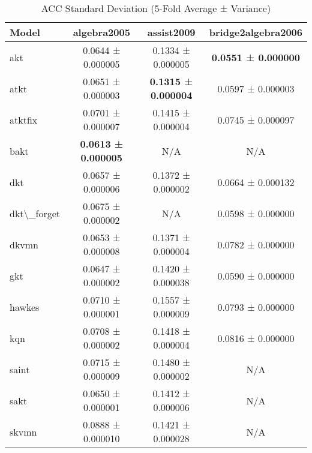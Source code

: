 \begin{table}[H]
\centering
\caption{ACC Standard Deviation (5-Fold Average ± Variance)}
\label{tab:acc_std}
\begin{tabular}{lccc}
\toprule
Model & algebra2005 & assist2009 & bridge2algebra2006 \\
\midrule
akt & 0.0644 ± 0.000005 & 0.1334 ± 0.000005 & \textbf{0.0551 ± 0.000000} \\
atkt & 0.0651 ± 0.000003 & \textbf{0.1315 ± 0.000004} & 0.0597 ± 0.000003 \\
atktfix & 0.0701 ± 0.000007 & 0.1415 ± 0.000004 & 0.0745 ± 0.000097 \\
bakt & \textbf{0.0613 ± 0.000005} & N/A & N/A \\
dkt & 0.0657 ± 0.000006 & 0.1372 ± 0.000002 & 0.0664 ± 0.000132 \\
dkt\textbackslash{}_forget & 0.0675 ± 0.000002 & N/A & 0.0598 ± 0.000000 \\
dkvmn & 0.0653 ± 0.000008 & 0.1371 ± 0.000004 & 0.0782 ± 0.000000 \\
gkt & 0.0647 ± 0.000002 & 0.1420 ± 0.000038 & 0.0590 ± 0.000000 \\
hawkes & 0.0710 ± 0.000001 & 0.1557 ± 0.000009 & 0.0793 ± 0.000000 \\
kqn & 0.0708 ± 0.000002 & 0.1418 ± 0.000004 & 0.0816 ± 0.000000 \\
saint & 0.0715 ± 0.000009 & 0.1480 ± 0.000002 & N/A \\
sakt & 0.0650 ± 0.000001 & 0.1412 ± 0.000006 & N/A \\
skvmn & 0.0888 ± 0.000010 & 0.1421 ± 0.000028 & N/A \\
\bottomrule
\end{tabular}
\end{table}